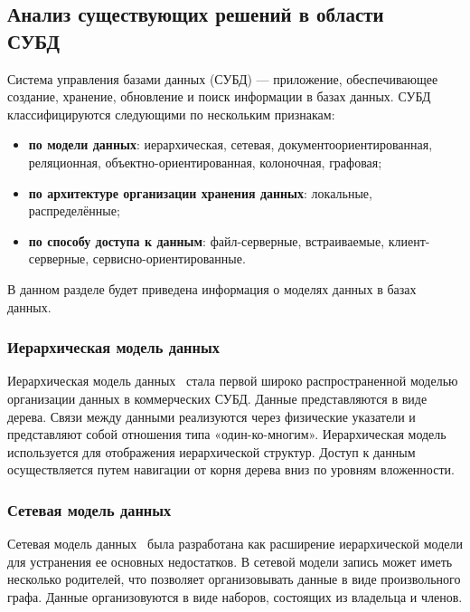 \subsection[Анализ существующих решений в области СУБД]{Анализ существующих решений в области \\ СУБД}
Система управления базами данных (СУБД) --- приложение, обеспечивающее создание, хранение, обновление и поиск информации в базах данных.
СУБД классифицируются следующими по нескольким признакам:
\begin{itemize}
\item \textbf{по модели данных}: иерархическая, сетевая, документоориентированная, реляционная, объектно-ориентированная, колоночная, графовая;
\item \textbf{по архитектуре организации хранения данных}: локальные, распределённые;
\item \textbf{по способу доступа к данным}: файл-серверные, встраиваемые, клиент-серверные, сервисно-ориентированные.
\end{itemize}
В данном разделе будет приведена информация о моделях данных в базах данных.


\subsubsection{Иерархическая модель данных}
Иерархическая модель данных~\cite{ierarch-db} стала первой широко распространенной моделью организации данных в коммерческих СУБД.
Данные представляются в виде дерева.
Связи между данными реализуются через физические указатели и представляют собой отношения типа «один-ко-многим».
Иерархическая модель используется для отображения иерархической структур.
Доступ к данным осуществляется путем навигации от корня дерева вниз по уровням вложенности.

\subsubsection{Сетевая модель данных}
Сетевая модель данных~\cite{network-db} была разработана как расширение иерархической модели для устранения ее основных недостатков.
В сетевой модели запись может иметь несколько родителей, что позволяет организовывать данные в виде произвольного графа.
Данные организовуются в виде наборов, состоящих из владельца и членов.

